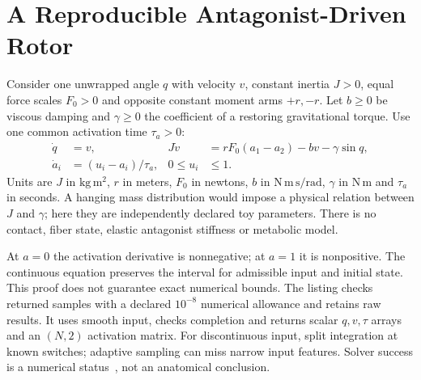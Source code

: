 \section{A Reproducible Antagonist-Driven Rotor}
Consider one unwrapped angle $q$ with velocity $v$, constant inertia $J>0$, equal
force scales $F_0>0$ and opposite constant moment arms $+r,-r$. Let $b\ge0$ be
viscous damping and $\gamma\ge0$ the coefficient of a restoring gravitational
torque. Use one common activation time $\tau_a>0$:
\begin{align}
 \dot q&=v, &J\dot v&=rF_0(a_1-a_2)-bv-\gamma\sin q,\\
 \dot a_i&=(u_i-a_i)/\tau_a,&0\le u_i&\le1.
\end{align}
Units are $J$ in $\mathrm{kg\,m^2}$, $r$ in meters, $F_0$ in newtons, $b$ in
$\mathrm{N\,m\,s/rad}$, $\gamma$ in $\mathrm{N\,m}$ and $\tau_a$ in seconds.
A hanging mass distribution would impose a physical relation between $J$ and
$\gamma$; here they are independently declared toy parameters. There is no contact,
fiber state, elastic antagonist stiffness or metabolic model.

At $a=0$ the activation derivative is nonnegative; at $a=1$ it is nonpositive.
The continuous equation preserves the interval for admissible input and initial
state. This proof does not guarantee exact numerical bounds. The listing checks
returned samples with a declared $10^{-8}$ numerical allowance and retains raw
results. It uses smooth input, checks completion and returns scalar $q,v,\tau$
arrays and an $(N,2)$ activation matrix. For discontinuous input, split integration
at known switches; adaptive sampling can miss narrow input features. Solver success
is a numerical status~\cite{SciPyIVPRotor}, not an anatomical conclusion.

